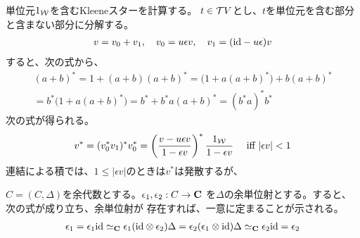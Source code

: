 	\begin{note}[単位元を含むKleeneスター]
	\label{note:単位元を含むKleeneスター} %
		単位元$1_{{\mathcal{W}}}$を含むKleeneスターを計算する。
		$t\in {\ensuremath{{\mathcal{T}}}} V$とし、$t$を単位元を含む部分と含まない部分に分解する。
		\begin{equation*}\begin{split}
			v = v_0 + v_1,\quad v_0 = u\epsilon v
			,\quad v_1 = ({\operatorname{id}} - u\epsilon) v
		\end{split}\end{equation*}
		すると、次の式から、
		\begin{equation*}\begin{split}
			(a + b)^* = 1 + (a + b)(a + b)^* 
			= \bigl(1 + a(a + b)^*\bigr) + b(a + b)^* \\
			= b^*\bigl(1 + a(a + b)^*\bigr)
			= b^* + b^*a(a + b)^*
			= (b^*a)^*b^*
		\end{split}\end{equation*}
		次の式が得られる。
		\begin{equation*}\begin{split}
			v^* = (v_0^*v_1)^*v_0^* 
			= \left(\frac{v - u\epsilon v}{1 - \epsilon v}\right)^*
				\frac{1_{{\mathcal{W}}}}{1 - \epsilon v}
				\quad\text{ iff } |\epsilon v| < 1
		\end{split}\end{equation*}
		連結による積では、$1\le |\epsilon v|$のときは$v^*$は発散するが、
	\end{note} %

	\begin{note}[余単位射の唯一性]\label{note:余単位射の唯一性} %
		$C=(C,\Delta)$を余代数とする。$\epsilon_1,\epsilon_2:C\to\mathbf{C}$
		を$\Delta$の余単位射とする。すると、次の式が成り立ち、余単位射が
		存在すれば、一意に定まることが示される。
		\begin{equation*}\begin{split}
			\epsilon_1 = \epsilon_1{\operatorname{id}}
			\simeq_{\mathbf{C}} \epsilon_1({\operatorname{id}}\otimes \epsilon_2)\Delta
			= \epsilon_2(\epsilon_1\otimes {\ensuremath{\operatorname{id}}})\Delta
			\simeq_{\mathbf{C}} \epsilon_2{\operatorname{id}} = \epsilon_2
		\end{split}\end{equation*}
	\end{note} %

